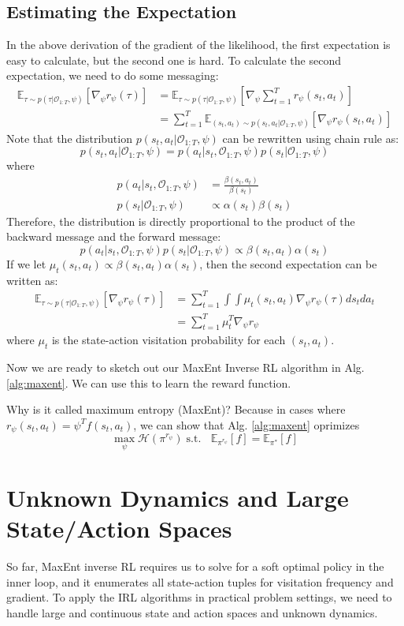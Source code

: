 \subsection{Estimating the Expectation}
In the above derivation of the gradient of the likelihood, the first expectation is easy to calculate, but the second one is hard. To calculate the second expectation, we need to do some messaging:
\begin{align*}
    \mathbb{E}_{\tau\sim p(\tau|\mathcal{O}_{1:T},\psi)}[\nabla_\psi r_\psi(\tau)] &= \mathbb{E}_{\tau\sim p(\tau|\mathcal{O}_{1:T},\psi)}\left[\nabla_\psi\sum_{t=1}^Tr_\psi(s_t,a_t)\right]\\
    &= \sum_{t=1}^T\mathbb{E}_{(s_t,a_t)\sim p(s_t,a_t|\mathcal{O}_{1:T},\psi)}[\nabla_\psi r_\psi(s_t,a_t)]
\end{align*}
Note that the distribution $p(s_t,a_t|\mathcal{O}_{1:T},\psi)$ can be rewritten using chain rule as:
\[
p(s_t,a_t|\mathcal{O}_{1:T},\psi) = p(a_t|s_t,\mathcal{O}_{1:T},\psi)p(s_t|\mathcal{O}_{1:T},\psi)
\]
where 
\begin{align*}
    p(a_t|s_t,\mathcal{O}_{1:T},\psi) &= \frac{\beta(s_t,a_t)}{\beta(s_t)}\\
    p(s_t|\mathcal{O}_{1:T},\psi)&\propto\alpha(s_t)\beta(s_t)
\end{align*}
Therefore, the distribution is directly proportional to the product of the backward message and the forward message:
\[
p(a_t|s_t,\mathcal{O}_{1:T},\psi)p(s_t|\mathcal{O}_{1:T},\psi)\propto\beta(s_t,a_t)\alpha(s_t)
\]
If we let $\mu_t(s_t,a_t)\propto\beta(s_t,a_t)\alpha(s_t)$, then the second expectation can be written as:
\begin{align*}
\mathbb{E}_{\tau\sim p(\tau|\mathcal{O}_{1:T},\psi)}[\nabla_\psi r_\psi(\tau)] &= \sum_{t=1}^T\int \int \mu_t(s_t,a_t)\nabla_\psi r_\psi(\tau)ds_tda_t\\
&= \sum_{t=1}^T\mu_t^T\nabla_\psi r_\psi
\end{align*}
where $\mu_t$ is the state-action visitation probability for each $(s_t,a_t)$.

Now we are ready to sketch out our MaxEnt Inverse RL algorithm in Alg. \ref{alg:maxent}. We can use this to learn the reward function.

Why is it called maximum entropy (MaxEnt)? Because in cases where $r_\psi(s_t,a_t) = \psi^Tf(s_t,a_t)$, we can show that Alg. \ref{alg:maxent} oprimizes
\[
\max_\psi\mathcal{H}(\pi^{r_\psi})\;\text{s.t. }\;\;
\mathbb{E}_{\pi^{r_\psi}}[f] = \mathbb{E}_{\pi^*}[f]
\]

\section{Unknown Dynamics and Large State/Action Spaces}
So far, MaxEnt inverse RL requires us to solve for a soft optimal policy in the inner loop, and it enumerates all state-action tuples for visitation frequency and gradient. To apply the IRL algorithms in practical problem settings, we need to handle large and continuous state and action spaces and unknown dynamics.

